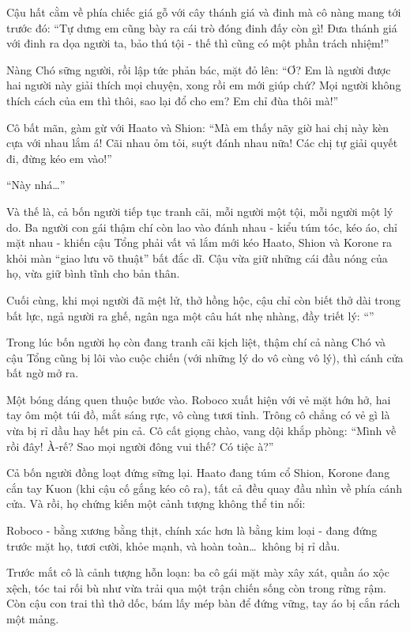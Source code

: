 \documentclass[../main.tex]{subfiles}
\begin{document}
Cậu hất cằm về phía chiếc giá gỗ với cây thánh giá và đinh mà cô nàng mang tới trước đó: ``Tự dưng em cũng bày ra cái trò đóng đinh đấy còn gì! Đưa thánh giá với đinh ra dọa người ta, bảo thú tội - thế thì cũng có một phần trách nhiệm!''

Nàng Chó sững người, rồi lập tức phản bác, mặt đỏ lên: ``Ơ? Em là người được hai người này giải thích mọi chuyện, xong rồi em mới giúp chứ? Mọi người không thích cách của em thì thôi, sao lại đổ cho em? Em chỉ đùa thôi mà!''

Cô bất mãn, gàm gừ với Haato và Shion: ``Mà em thấy nãy giờ hai chị này kèn cựa với nhau lắm á! Cãi nhau ỏm tỏi, suýt đánh nhau nữa! Các chị tự giải quyết đi, đừng kéo em vào!''

``Này nhá\dots''

Và thế là, cả bốn người tiếp tục tranh cãi, mỗi người một tội, mỗi người một lý do. Ba người con gái thậm chí còn lao vào đánh nhau - kiểu túm tóc, kéo áo, chỉ mặt nhau - khiến cậu Tổng phải vất vả lắm mới kéo Haato, Shion và Korone ra khỏi màn ``giao lưu võ thuật'' bất đắc dĩ. Cậu vừa giữ những cái đầu nóng của họ, vừa giữ bình tĩnh cho bản thân.

Cuối cùng, khi mọi người đã mệt lử, thở hồng hộc, cậu chỉ còn biết thở dài trong bất lực, ngả người ra ghế, ngân nga một câu hát nhẹ nhàng, đầy triết lý: ``''

\ct

Trong lúc bốn người họ còn đang tranh cãi kịch liệt, thậm chí cả nàng Chó và cậu Tổng cũng bị lôi vào cuộc chiến (với những lý do vô cùng vô lý), thì cánh cửa bất ngờ mở ra.

Một bóng dáng quen thuộc bước vào. Roboco  xuất hiện với vẻ mặt hớn hở, hai tay ôm một túi đồ, mắt sáng rực, vô cùng tươi tỉnh. Trông cô chẳng có vẻ gì là vừa bị rỉ dầu hay hết pin cả. Cô cất giọng chào, vang dội khắp phòng: ``Mình về rồi đây! À-rế? Sao mọi người đông vui thế? Có tiệc à?''


Cả bốn người đồng loạt đứng sững lại. Haato đang túm cổ Shion, Korone đang cắn tay Kuon (khi cậu cố gắng kéo cô ra), tất cả đều quay đầu nhìn về phía cánh cửa. Và rồi, họ chứng kiến một cảnh tượng không thể tin nổi:

Roboco - bằng xương bằng thịt, chính xác hơn là bằng kim loại - đang đứng trước mặt họ, tươi cười, khỏe mạnh, và hoàn toàn\dots\ không bị rỉ dầu.

Trước mắt cô là cảnh tượng hỗn loạn: ba cô gái mặt mày xây xát, quần áo xộc xệch, tóc tai rối bù như vừa trải qua một trận chiến sống còn trong rừng rậm. Còn cậu con trai thì thở dốc, bám lấy mép bàn để đứng vững, tay áo bị cắn rách một mảng.
\end{document}
